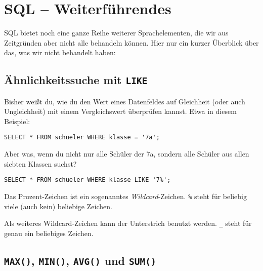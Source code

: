 \clearpage

\rehead[]{\textcolor{lightblue}{AvHG, Inf, My}}
\lohead[]{\textcolor{lightblue}{AvHG, Inf, My}}

\section[\hspace{1mm} SQL -- Weiterführendes]{SQL -- Weiterführendes}

SQL bietet noch eine ganze Reihe weiterer Sprachelementen, die wir aus
Zeitgründen aber nicht alle behandeln können. Hier nur ein kurzer Überblick über das, was
wir nicht behandelt haben:

\subsection{Ähnlichkeitssuche mit \texttt{LIKE}}

Bisher weißt du, wie du den Wert eines Datenfeldes auf Gleichheit (oder auch
Ungleichheit) mit einem Vergleichswert überprüfen kannst. Etwa in diesem
Beispiel:

\begin{lstlisting}
SELECT * FROM schueler WHERE klasse = '7a';
\end{lstlisting}

Aber was, wenn du nicht nur alle Schüler der 7a, sondern alle Schüler aus allen
siebten Klassen suchst?

\begin{lstlisting}
SELECT * FROM schueler WHERE klasse LIKE '7%';
\end{lstlisting}

Das Prozent-Zeichen ist ein sogenanntes \emph{Wildcard}-Zeichen. \lstinline|%|
steht für beliebig viele (auch kein) beliebige Zeichen.

Als weiteres Wildcard-Zeichen kann der Unterstrich benutzt werden. \lstinline|_|
steht  für genau ein beliebiges Zeichen.

\subsection{\texttt{MAX()}, \texttt{MIN()}, \texttt{AVG()} und \texttt{SUM()}}

